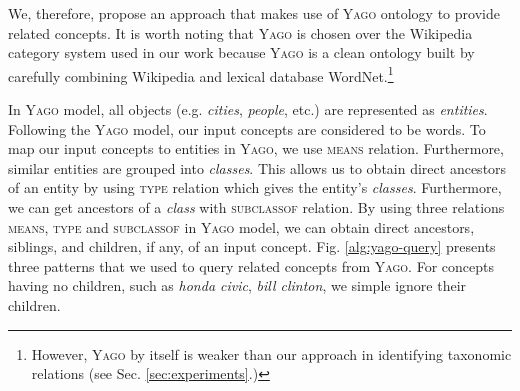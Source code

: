 
We, therefore, propose an approach that makes use of \textsc{Yago}
ontology \cite{suchanek2007WWW} to provide related concepts. It is
worth noting that \textsc{Yago} is chosen over the Wikipedia category
system used in our work because \textsc{Yago} is a clean ontology
built by carefully combining Wikipedia and lexical database
WordNet.\footnote{However, \textsc{Yago} by itself is weaker than our
  approach in identifying taxonomic relations (see
  Sec. \ref{sec:experiments}.)}

In \textsc{Yago} model, all objects (e.g. {\em cities}, {\em people},
etc.)  are represented as {\em entities}. Following the \textsc{Yago}
model, our input concepts are considered to be words. To map our input
concepts to entities in \textsc{Yago}, we use \textsc{means}
relation. Furthermore, similar entities are grouped into {\em
  classes}. This allows us to obtain direct ancestors of an entity by
using \textsc{type} relation which gives the entity's {\em
  classes}. Furthermore, we can get ancestors of a {\em class} with
\textsc{subclassof} relation. By using three relations \textsc{means},
\textsc{type} and \textsc{subclassof} in \textsc{Yago} model, we can
obtain direct ancestors, siblings, and children, if any, of an input
concept. Fig. \ref{alg:yago-query} presents three patterns that we
used to query related concepts from \textsc{Yago}. For concepts having
no children, such as {\em honda civic}, {\em bill clinton}, we simple
ignore their children.


